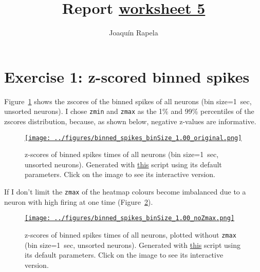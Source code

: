 \documentclass[12pt]{article}
\title{Report
\href{https://drive.google.com/file/d/1r90rlJpFKilQmNj1h27gmZdyi-RJeCq_/view?usp=share_link}{worksheet 5}}
\author{Joaqu\'{i}n Rapela}
\begin{document}
\maketitle

\section*{Exercise 1: z-scored binned spikes}

Figure~\ref{fig:zscores_unsorted} shows the zscores of the binned spikes of all
neurons (bin size=1~sec, unsorted neurons). I chose \texttt{zmin} and
\texttt{zmax} as the 1\% and 99\% percentiles of the zscores distribution,
because, as shown below, negative z-values are informative.


\begin{figure}[H]
    \begin{center}
        \href{https://www.gatsby.ucl.ac.uk/~rapela/neuroinformatics/2023/ws5/figures/binned_spikes_binSize_1.00_original.html}{\texttt{[image: ../figures/binned\_spikes\_binSize\_1.00\_original.png]}}

        \caption{z-scores of binned spikes times of all neurons (bin
        size=1~sec, unsorted neurons).  Generated with
        \href{https://github.com/joacorapela/neuroinformatics23/blob/master/worksheets/ws5/mySolution/code/scripts/doEx1Plotly.py}{this}
        script using its default parameters. Click on the image to see its
        interactive version.}

        \label{fig:zscores_unsorted}
    \end{center}
\end{figure}

If I don't limit the \texttt{zmax} of the heatmap colours become imbalanced due
to a neuron with high firing at one time
(Figure~\ref{fig:zscores_unsorted_noZmax}). 

\begin{figure}[H]
    \begin{center}
        \href{https://www.gatsby.ucl.ac.uk/~rapela/neuroinformatics/2023/ws5/figures/binned_spikes_binSize_1.00_noZmax.html}{\texttt{[image: ../figures/binned\_spikes\_binSize\_1.00\_noZmax.png]}}

        \caption{z-scores of binned spikes times of all neurons, plotted
        without \texttt{zmax} (bin size=1~sec, unsorted neurons). Generated
        with
        \href{https://github.com/joacorapela/neuroinformatics23/blob/master/worksheets/ws5/mySolution/code/scripts/doEx1Plotly.py}{this}
        script using its default parameters. Click on the image to see its
        interactive version.}

        \label{fig:zscores_unsorted_noZmax}
    \end{center}
\end{figure}
\end{document}
